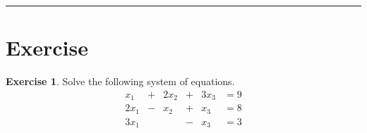 \documentclass[
]{book}
\theoremstyle{definition}
\theoremstyle{definition}
\theoremstyle{definition}
\newtheorem{exercise}{Exercise}[chapter]
\theoremstyle{definition}
\theoremstyle{remark}
\begin{document}
\begin{center}\rule{0.5\linewidth}{0.5pt}\end{center}

\section{Exercise}\label{exercise-8}

\begin{exercise}
\protect\hypertarget{exr:unnamed-chunk-47}{}\label{exr:unnamed-chunk-47}Solve the following system of equations.
\[
\begin{array}{ccccccc}
x_1  &+& 2x_2 &+& 3x_3 &= 9 \\
2x_1 &-& x_2  &+& x_3  &= 8 \\
3x_1 & &      &-& x_3&= 3
\end{array}
\]
\end{exercise}
\end{document}
